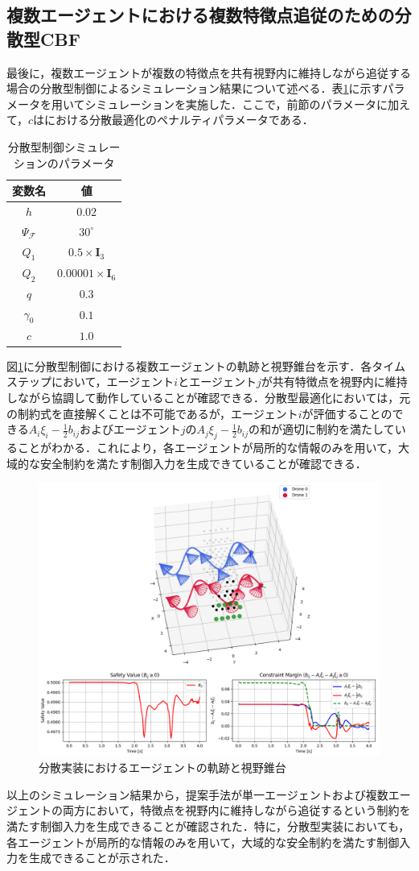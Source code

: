 \subsection{複数エージェントにおける複数特徴点追従のための分散型CBF}

最後に，複数エージェントが複数の特徴点を共有視野内に維持しながら追従する場合の分散型制御によるシミュレーション結果について述べる．表\ref{tab:distributed_params}に示すパラメータを用いてシミュレーションを実施した．ここで，前節のパラメータに加えて，$c$はにおける分散最適化のペナルティパラメータである．

\begin{table}[htbp]
\centering
\caption{分散型制御シミュレーションのパラメータ}
\label{tab:distributed_params}
\begin{tabular}{cc}
\hline
変数名 & 値 \\
\hline
$h$ & $0.02$ \\
$\Psi_{\mathcal{F}}$ & $30^{\circ}$ \\
$Q_1$ & $0.5\times \mathbf{I}_3$ \\
$Q_2$ & $0.00001\times\mathbf{I}_6$ \\
$q$ & $0.3$ \\
$\gamma_0$ & $0.1$ \\
$c$ & $1.0$ \\
\hline
\end{tabular}
\end{table}

図\ref{fig:distributed_trajectory}に分散型制御における複数エージェントの軌跡と視野錐台を示す．各タイムステップにおいて，エージェント$i$とエージェント$j$が共有特徴点を視野内に維持しながら協調して動作していることが確認できる．分散型最適化においては，元の制約式を直接解くことは不可能であるが，エージェント$i$が評価することのできる$A_i\xi_i-\frac{1}{2}b_{ij}$およびエージェント$j$の$A_j\xi_j-\frac{1}{2}b_{ij}$の和が適切に制約を満たしていることがわかる．これにより，各エージェントが局所的な情報のみを用いて，大域的な安全制約を満たす制御入力を生成できていることが確認できる．

\begin{figure}[htbp]
\centering
\includegraphics[width=0.6\linewidth]{fig/pcl_multi_distrib.png}
\caption{分散実装におけるエージェントの軌跡と視野錐台}
\label{fig:distributed_trajectory}
\end{figure}

以上のシミュレーション結果から，提案手法が単一エージェントおよび複数エージェントの両方において，特徴点を視野内に維持しながら追従するという制約を満たす制御入力を生成できることが確認された．特に，分散型実装においても，各エージェントが局所的な情報のみを用いて，大域的な安全制約を満たす制御入力を生成できることが示された．
